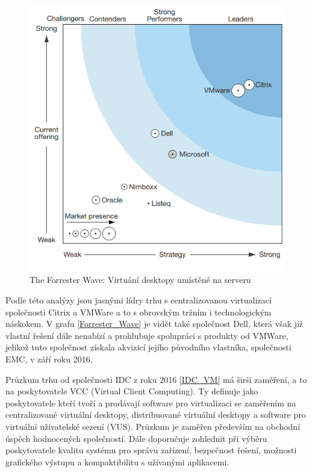  \begin{figure}[h]\label{Forrester_Wave}
\includegraphics[width=13cm]{img/Forrester_Wave}
\caption{The Forrester Wave: Virtuání desktopy umístěné na serveru} 
\label{EMM:quadrant}
\centering
\end{figure}

Podle této analýzy jsou jasnými lídry trhu s centralizovanou virtualizací společnosti Citrix a VMWare a to s obrovským tržním i technologickým náskokem. V grafu \ref{Forrester_Wave} je vidět také společnost Dell, která však již vlastní řešení dále nenabízí a prohlubuje spolupráci s produkty od VMWare, jelikož tuto společnost získala akvizicí jejího původního vlastníka, společnosti EMC, v září roku 2016.  

Průzkum trhu od společnosti IDC z roku 2016  \ref{IDC_VM} má širší zaměření, a to na poskytovatele VCC (Virtual Client Computing). Ty definuje jako poskytovatele kteří tvoří a prodávají software pro virtualizaci se zaměřením na centralizované virtuální desktopy, distribuované virtuální desktopy a software pro virtuální uživatelské sezení (VUS). Průzkum je zaměřen především na obchodní úspěch hodnocených společností. Dále doporučuje zohlednit při výběru poskytovatele kvalitu systému pro správu zařízení, bezpečnost řešení, možnosti grafického výstupu a kompaktibilitu s užívanými aplikacemi. 

